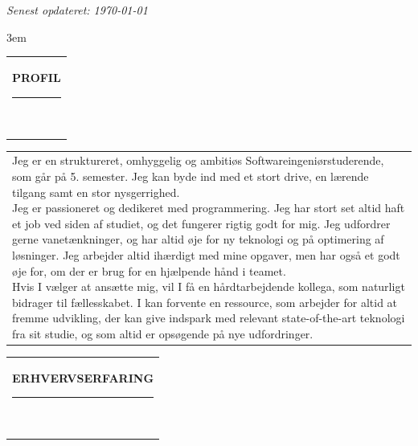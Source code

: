 \documentclass[10pt,A4]{article}
\newcommand{\mpwidth}{\linewidth-\fboxsep-\fboxsep}
\newcommand{\cvtext}[1] {
	\begin{tabular*}{1\mpwidth}{p{1\mpwidth}}
		\parbox{1\mpwidth}{#1}
	\end{tabular*}
}
\newcommand{\cvsection}[1] {
	\vspace{14pt}
	\cvtext{
		\textbf{\huge{\textcolor{darkcol}{\uppercase{#1}}}}\\[-4pt]
		\textcolor{maincol}{ \rule{0.1\textwidth}{2pt} } \\
	}
}
\begin{document}
\begin{paracol}{2}
\begin{rightcolumn}
\textit{Senest opdateret: \today}

\vfill\null
\emergencystretch 3em
\cvsection{PROFIL}

\cvtext{Jeg er en struktureret, omhyggelig og ambitiøs Softwareingeniørstuderende, som går på 5. semester. Jeg kan byde ind med et stort drive, en lærende tilgang samt en stor nysgerrighed.\\

Jeg er passioneret og dedikeret med programmering. Jeg har stort set altid haft et job ved siden af studiet, og det fungerer rigtig godt for mig. Jeg udfordrer gerne vanetænkninger, og har altid øje for ny teknologi og på optimering af løsninger. Jeg arbejder altid ihærdigt med mine opgaver, men har også et godt øje for, om der er brug for en hjælpende hånd i teamet.\\

Hvis I vælger at ansætte mig, vil I få en hårdtarbejdende kollega, som naturligt bidrager til fællesskabet. I kan forvente en ressource, som arbejder for altid at fremme udvikling, der kan give indspark med relevant state-of-the-art teknologi fra sit studie, og som altid er opsøgende på nye udfordringer.
}

\vfill\null
\cvsection{ERHVERVSERFARING}


\end{rightcolumn}
\end{paracol}
\end{document}
